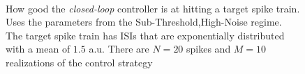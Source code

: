 \documentclass[12pt]{iopart}
\begin{document}
\begin{figure}[htp]
\begin{center}    \\
  \caption[ ]{How good the {\sl closed-loop} controller is at hitting a target
  spike train. Uses the parameters from the Sub-Threshold,High-Noise regime. The
  target spike train has ISIs that are exponentially distributed with a
  mean of $1.5$ a.u. There are $N=20$ spikes and $M=10$ realizations of the
  control strategy}
  \label{fig:targettrain_cl_highnoise}
\end{center}
\end{figure}
\end{document}

